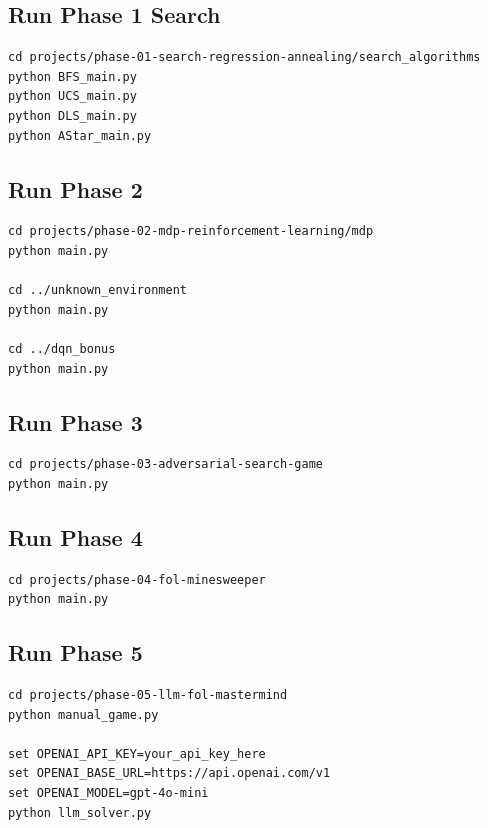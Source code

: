 \documentclass[11pt,a4paper]{article}
\begin{document}
\subsection{Run Phase 1 Search}

\begin{lstlisting}
cd projects/phase-01-search-regression-annealing/search_algorithms
python BFS_main.py
python UCS_main.py
python DLS_main.py
python AStar_main.py
\end{lstlisting}

\subsection{Run Phase 2}

\begin{lstlisting}
cd projects/phase-02-mdp-reinforcement-learning/mdp
python main.py

cd ../unknown_environment
python main.py

cd ../dqn_bonus
python main.py
\end{lstlisting}

\subsection{Run Phase 3}

\begin{lstlisting}
cd projects/phase-03-adversarial-search-game
python main.py
\end{lstlisting}

\subsection{Run Phase 4}

\begin{lstlisting}
cd projects/phase-04-fol-minesweeper
python main.py
\end{lstlisting}

\subsection{Run Phase 5}

\begin{lstlisting}
cd projects/phase-05-llm-fol-mastermind
python manual_game.py

set OPENAI_API_KEY=your_api_key_here
set OPENAI_BASE_URL=https://api.openai.com/v1
set OPENAI_MODEL=gpt-4o-mini
python llm_solver.py
\end{lstlisting}
\end{document}
